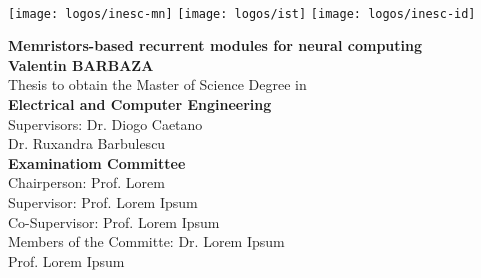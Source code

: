 \newcommand\blurredimage[3]{
  \node[opacity=0.2] at (#1) {\texttt{[image: \#3]}};
  \node[opacity=0.2] at (#1+ #2, #2) {\texttt{[image: \#3]}};
  \node[opacity=0.2] at (#1+-#2, #2) {\texttt{[image: \#3]}};
  \node[opacity=0.2] at (#1+-#2,-#2) {\texttt{[image: \#3]}};
  \node[opacity=0.2] at (#1+ #2,-#2) {\texttt{[image: \#3]}};
  }

  \setcounter{page}{1} 


  \thispagestyle{empty}

  \begin{flushleft}
    ~\\ \vspace{-12mm} \hspace{-12mm}
    \texttt{[image: logos/inesc-mn]}
    \hfill
    \texttt{[image: logos/ist]}
    \hfill
    \texttt{[image: logos/inesc-id]}
    \vspace{10mm}
    \\ \begin{center}
    \end{center} %

    \vspace{5mm}
    \centering
    \LARGE \textbf{Memristors-based recurrent modules for neural computing}
    \\ \vspace{15mm}
    \Large \textbf{Valentin BARBAZA} \\
    \vspace{12mm}
    \large Thesis to obtain the Master of Science Degree in
    \\ \vspace{2mm}
    \LARGE \textbf{Electrical and Computer Engineering}
    \\ \vspace{10mm}
    \large Supervisors: Dr. Diogo Caetano \\
    \large Dr. Ruxandra Barbulescu
    \\ \vspace{15mm}
    \Large \textbf{Examinatiom Committee}
    \\ \vspace{5mm}
    \large Chairperson: Prof. Lorem \\
    \large Supervisor: Prof. Lorem Ipsum\\
    \large Co-Supervisor: Prof. Lorem Ipsum \\
    \large Members of the Committe: Dr. Lorem Ipsum \\
    Prof. Lorem Ipsum


\end{flushleft}
